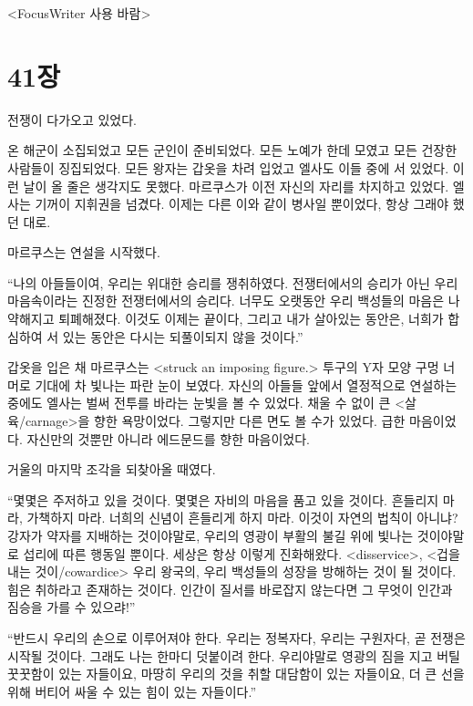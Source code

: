 ﻿<FocusWriter 사용 바람>


\chapter[41장  ~~][41장\hspace*{.5em}~~]{41장 \ ~~}



전쟁이 다가오고 있었다.

온 해군이 소집되었고 모든 군인이 준비되었다. 모든 노예가 한데 모였고 모든 건장한 사람들이 징집되었다. 모든 왕자는 갑옷을 차려 입었고 엘사도 이들 중에 서 있었다. 이런 날이 올 줄은 생각지도 못했다. 마르쿠스가 이전 자신의 자리를 차지하고 있었다. 엘사는 기꺼이 지휘권을 넘겼다. 이제는 다른 이와 같이 병사일 뿐이었다, 항상 그래야 했던 대로.

마르쿠스는 연설을 시작했다.

``나의 아들들이여, 우리는 위대한 승리를 쟁취하였다. 전쟁터에서의 승리가 아닌 우리 마음속이라는 진정한 전쟁터에서의 승리다. 너무도 오랫동안 우리 백성들의 마음은 나약해지고 퇴폐해졌다. 이것도 이제는 끝이다, 그리고 내가 살아있는 동안은, 너희가 합심하여 서 있는 동안은 다시는 되풀이되지 않을 것이다.''

갑옷을 입은 채 마르쿠스는 <struck an imposing figure.> 투구의 Y자 모양 구멍 너머로 기대에 차 빛나는 파란 눈이 보였다. 자신의 아들들 앞에서 열정적으로 연설하는 중에도 엘사는 벌써 전투를 바라는 눈빛을 볼 수 있었다. 채울 수 없이 큰 <살육/carnage>을 향한 욕망이었다. 그렇지만 다른 면도 볼 수가 있었다. 급한 마음이었다. 자신만의 것뿐만 아니라 에드문드를 향한 마음이었다.

거울의 마지막 조각을 되찾아올 때였다.

``몇몇은 주저하고 있을 것이다. 몇몇은 자비의 마음을 품고 있을 것이다. 흔들리지 마라, 가책하지 마라. 너희의 신념이 흔들리게 하지 마라. 이것이 자연의 법칙이 아니냐? 강자가 약자를 지배하는 것이야말로, 우리의 영광이 부활의 불길 위에 빛나는 것이야말로 섭리에 따른 행동일 뿐이다. 세상은 항상 이렇게 진화해왔다. <disservice>, <겁을 내는 것이/cowardice> 우리 왕국의, 우리 백성들의 성장을 방해하는 것이 될 것이다. 힘은 취하라고 존재하는 것이다. 인간이 질서를 바로잡지 않는다면 그 무엇이 인간과 짐승을 가를 수 있으랴!''

``반드시 우리의 손으로 이루어져야 한다. 우리는 정복자다, 우리는 구원자다, 곧 전쟁은 시작될 것이다. 그래도 나는 한마디 덧붙이려 한다. 우리야말로 영광의 짐을 지고 버틸 꿋꿋함이 있는 자들이요, 마땅히 우리의 것을 취할 대담함이 있는 자들이요, 더 큰 선을 위해 버티어 싸울 수 있는 힘이 있는 자들이다.''

